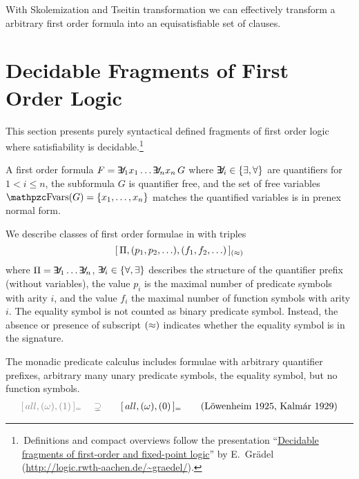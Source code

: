 \begin{lemma}
With Skolemization and Tseitin transformation we can effectively transform a arbitrary first order formula into an equisatisfiable set of clauses.	
\end{lemma}


\section{Decidable Fragments of First Order Logic}\label{sec:decidable:fol:fragments}

This section presents purely syntactical defined fragments
of first order logic where satisfiability is decidable.\footnote{
	\,Definitions and compact overviews follow the presentation
	“\href{http://logic.rwth-aachen.de/~graedel/kalmar.pdf}{Decidable fragments of first-order and fixed-point logic}”
	by E.~Grädel (\url{http://logic.rwth-aachen.de/~graedel/}).	
}  



\begin{definition}[\PNF]
	A first order formula $F = \quantify_1 x_1 \ldots \quantify_n x_n\, G$ 
	where $\quantify_i \in \{\exists,\forall\}$ are quantifiers
	for $1 < i \leq n$,
	the subformula $G$ is quantifier free, and 
	the set of free variables $\fvar(G) = \{ x_1, \ldots, x_n \}$
	matches the quantified variables
	is in {\myem prenex normal form}.
\end{definition}


\begin{definition}[\cite{MR1482227}]\label{def:prefix:class}
	We describe classes of first order formulae in \PNF with triples
	\[
	[\, \Pi, (p_1,p_2,\ldots), (f_1,f_2,\ldots)\,]_{(\approx)}
	\]
	where $\Pi = \quantify_1 \ldots \quantify_n$, $\quantify_i\in\{\forall,\exists\}$ 
	describes the structure of the quantifier prefix (without variables),
	the value $p_i$ is the maximal number of predicate symbols with arity $i$,
	and the value $f_i$ the maximal number of function symbols with arity $i$.
	The equality symbol is not counted as binary predicate symbol. Instead,
	the absence or presence of subscript $(\approx)$ indicates whether the equality symbol is in the signature. 
	
\end{definition}

\begin{example}\label{ex:monadic}
	The monadic predicate calculus includes formulae with arbitrary quantifier prefixes, 
	arbitrary many unary predicate symbols, the equality symbol, but no function symbols.
	\begin{gather*}
	{\colG [\,all, (\omega), (1)\,]_= 
	\quad\supsetneq}\qquad 
	[\,all, (\omega), (0 ) \,]_=
	\tag{Löwenheim 1925, Kalmár 1929}
	\end{gather*}
\end{example}

